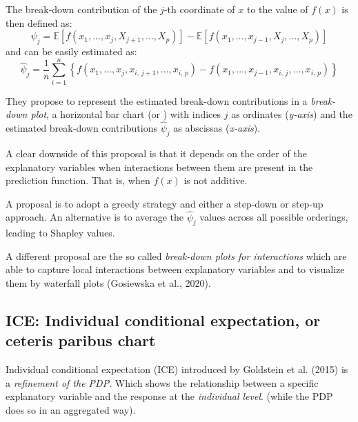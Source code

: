 The break-down contribution of the $j$-th coordinate of $x$ to the
value of $f(x)$ is then defined as:
\begin{equation*}
    \psi_j = \mathds E \left[
        f(x_1,\ldots,x_j,X_{j+1},\ldots,X_p)
    \right] - \mathds E \left[
        f(x_1,\ldots,x_{j-1},X_{j},\ldots,X_p)
    \right]
\end{equation*}
and can be easily estimated as:
\begin{equation*}
    \hat \psi_j = \frac{1}{n} \sum_{i=1}^n \left\{
        f(x_1,\ldots,x_j,x_{i,\,j+1},\ldots,x_{i,\,p})
        -
        f(x_1,\ldots,x_{j-1},x_{i,\,j},\ldots,x_{i,\,p})
    \right\}
\end{equation*}

They propose to represent the estimated break-down contributions
in a \emph{break-down plot}, a horizontal bar chart (or )
with indices $j$ as ordinates (\emph{y-axis}) and the estimated
break-down contributions $\hat \psi_j$ as abscissas (\emph{x-axis}).

\begin{note}
    A clear downside of this proposal is that it depends on the order of the explanatory
    variables when interactions between them are present in the prediction
    function. That is, when $f(x)$ is not additive.
\end{note}

A proposal is to adopt a greedy strategy and either a step-down or step-up
approach. An alternative is to average the $\hat \psi_j$ values across all
possible orderings, leading to Shapley values.

A different proposal are the so called \emph{break-down plots for interactions}
which are able to capture local interactions between explanatory variables and to
visualize them by waterfall plots (Gosiewska et al., 2020). %

\subsection{ICE: Individual conditional expectation, or ceteris paribus chart}

\begin{definition}{Individual conditional expectation (ICE)}{}
    introduced by Goldstein et al. (2015) %
    is a \emph{refinement of the PDP}. Which shows the relationship between a
    specific explanatory variable and the response at the \emph{individual level}.
    (while the PDP does so in an aggregated way).
\end{definition}

